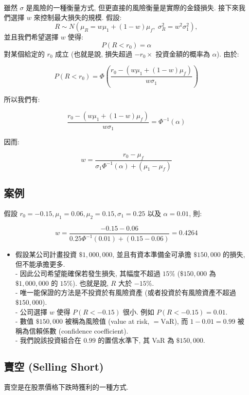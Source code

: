 \documentclass[letterpaper]{article}
\begin{document}
		雖然 $\sigma$ 是風險的一種衡量方式, 但更直接的風險衡量是實際的金錢損失. 接下來我們選擇 $w$ 來控制最大損失的規模. 假設: 
		$$
		R \sim N\left (\mu_{R} = w \mu_{1} + (1-w)\mu_{f}, \; \sigma_{R}^{2} = w^{2}\sigma_{1}^{2}\right), 
		$$
		並且我們希望選擇 $w$ 使得: 
		$$
		P\left (R < r_{0}\right) = \alpha
		$$
		對某個給定的 $r_{0}$ 成立 (也就是說, 損失超過 $-r_{0} \times$ 投資金額的概率為 $\alpha$). 由於: 
		
		$$
		P\left (R<r_{0}\right)=\Phi\left (\frac{r_{0}-\left (w \mu_{1}+ (1-w) \mu_{f}\right)}{w \sigma_{1}}\right)
		$$
		
		所以我們有: 
		
		$$
		\frac{r_{0}-\left (w \mu_{1}+ (1-w) \mu_{f}\right)}{w \sigma_{1}}=\Phi^{-1} (\alpha)
		$$
		
		因而: 
		
		$$
		w=\frac{r_{0}-\mu_{f}}{\sigma_{1} \Phi^{-1} (\alpha)+\left (\mu_{1}-\mu_{f}\right)}
		$$
		
		\subsection{案例}
		假設 $r_{0}=-0.15, \mu_{1}=0.06, \mu_{2}=0.15, \sigma_{1}=0.25$ 以及 $\alpha=0.01$, 則: 
		
		$$
		w=\frac{-0.15-0.06}{0.25 \Phi^{-1} (0.01)+ (0.15-0.06)}=0.4264
		$$
		
		\begin{itemize}
			\item 假設某公司計畫投資 $\$1, 000, 000$, 並且有資本準備金可承擔 $\$150, 000$ 的損失, 但不能承擔更多. \\
			- 因此公司希望能確保若發生損失, 其幅度不超過 $15\%$ ($\$150, 000$ 為 $\$1, 000, 000$ 的 $15\%$). 也就是說, $R$ 大於 $-15\%$. \\
			- 唯一能保證的方法是不投資於有風險資產 (或者投資於有風險資產不超過 $\$150, 000$). \\
			- 公司選擇 $w$ 使得 $P (R < -0.15)$ 很小. 例如 $P (R < -0.15) = 0.01$. \\
			- 數值 $\$150, 000$ 被稱為風險值 (value at risk, $=\mathrm{VaR}$), 而 $1 - 0.01 = 0.99$ 被稱為信賴係數 (confidence coefficient). \\
			- 我們說該投資組合在 $0.99$ 的置信水準下, 其 VaR 為 $\$150, 000$. 
		\end{itemize}
		
		
		\subsection{賣空 (Selling Short)}
		賣空是在股票價格下跌時獲利的一種方式. 
		
\end{document}
